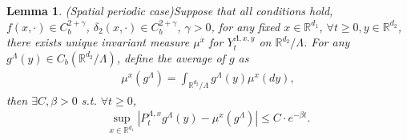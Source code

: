 \documentclass[11pt,reqno]{amsart}
\newtheorem{lemma}{\indent Lemma}[section]
\numberwithin{equation}{section}
\newcommand{\ga}{\gamma}
\newcommand{\de}{\delta}
\begin{document}


\begin{lemma}(Spatial periodic case)\label{L41}
Suppose that all conditions hold, $f(x,\cdot)\in C_{b}^{2+\ga}$, $\de_2(x,\cdot)\in C_{b}^{2+\ga}$, $\gamma>0$,  for any fixed  $ x\in \mathbb{R}^{d_{1}}$, $\forall  t\geq0, y\in \mathbb{R}^{d_{2}}$, there exists unique invariant measure $\mu^{x}$ for $Y_{t}^{\Lambda,x,y}$ on $\mathbb{R}^{d_{2}}/\Lambda$.  For any $ g^\Lambda(y)\in C_{b}(\mathbb{R}^{d_{2}}/\Lambda)$,  define the average of $g$ as  
\begin{align*}
\mu^x(g^\Lambda)=\int_{\mathbb{R}^{d_{2}}/\Lambda}g^\Lambda(y)\mu^{x}(dy),
	\end{align*}
then $\exists C, \beta>0$ s.t. $\forall t\geq0$,
\begin{align}\label{exp}
	\sup_{x\in \mathbb{R}^{d_{1}}}| P_{t}^{\Lambda,x}g^\Lambda(y)-\mu^x(g^\Lambda)|\leq C\cdot e^{-\beta t}.
	\end{align}
\end{lemma}
\end{document}
